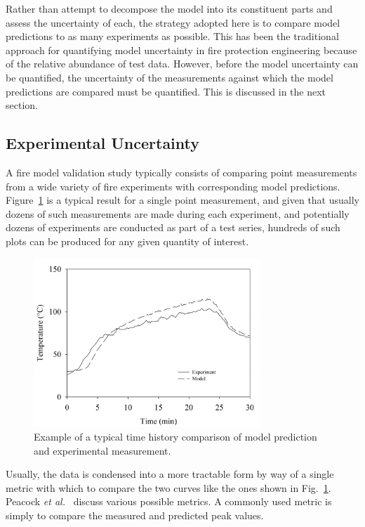Rather than attempt to decompose the model into its constituent parts and assess the uncertainty of
each, the strategy adopted here is to compare model predictions to as many
experiments as possible. This has been the traditional approach for quantifying model uncertainty in fire
protection engineering because of the relative abundance of test data.
However, before the model uncertainty can be quantified, the uncertainty of the
measurements against which the model predictions are compared must be quantified. This is discussed in the next section.


\subsection{Experimental Uncertainty}

A fire model validation study typically consists of comparing point measurements from a wide variety of fire experiments
with corresponding model predictions.
Figure~\ref{temp_history} is a typical result for a single point measurement, and given that usually
dozens of such measurements are made during each experiment,
and potentially dozens of experiments are conducted as part of a test series, hundreds of such plots can be
produced for any given quantity of interest.
\begin{figure}[t]
\begin{center}
\includegraphics[height=2.5in]{FIGURES/sample_time_history}
\end{center}
\caption[Sample time history plots.]{Example of a typical time history comparison of model prediction and experimental measurement.}
\label{temp_history}
\end{figure}
Usually, the data is condensed into a more tractable form by way of a single metric with which to
compare the two curves like the ones shown in Fig.~\ref{temp_history}. Peacock {\em et al.}~\cite{Peacock:FSJ1999}
discuss various possible metrics. A commonly used metric is simply to compare the measured and predicted peak values.
